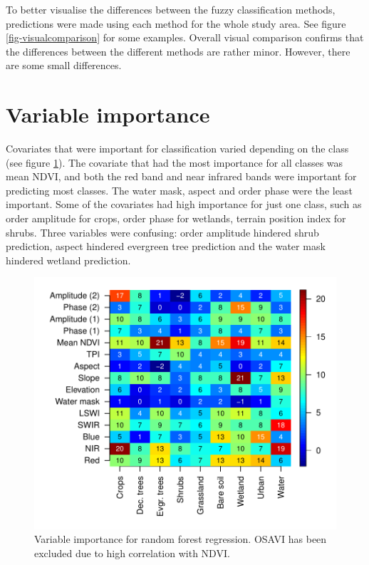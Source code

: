 \documentclass[a4paper,10pt]{book}
\begin{document}
To better visualise the differences between the fuzzy classification methods, predictions were made using each method for the whole study area. See figure \ref{fig-visualcomparison} for some examples. Overall visual comparison confirms that the differences between the different methods are rather minor. However, there are some small differences. %

\section{Variable importance}

Covariates that were important for classification varied depending on the class (see figure \ref{fig-variable-importance}). The covariate that had the most importance for all classes was mean NDVI, and both the red band and near infrared bands were important for predicting most classes. The water mask, aspect and  order phase were the least important. Some of the covariates had high importance for just one class, such as  order amplitude for crops,  order phase for wetlands, terrain position index for shrubs. Three variables were confusing:  order amplitude hindered shrub prediction, aspect hindered evergreen tree prediction and the water mask hindered wetland prediction.

\begin{figure}
  \centering
  \includegraphics[width=\textwidth]{../plot/variable-importance}
  \caption{Variable importance for random forest regression. OSAVI has been excluded due to high correlation with NDVI.}
  \label{fig-variable-importance}
\end{figure}
\end{document}

